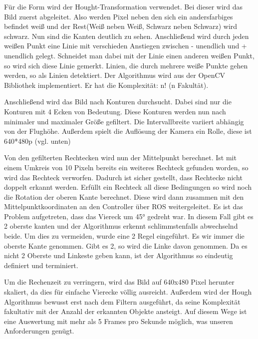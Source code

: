 Für die Form wird der Hought-Transformation verwendet. Bei dieser wird das Bild zuerst abgeleitet. Also werden Pixel neben den sich ein andersfarbiges befindet weiß und der Rest(Weiß neben Weiß, Schwarz neben Schwarz) wird schwarz. Nun sind die Kanten deutlich zu sehen. Anschließend wird durch jeden weißen Punkt eine Linie mit verschieden Anstiegen zwischen - unendlich und + unendlich gelegt. Schneidet man dabei mit der Linie einen anderen weißen Punkt, so wird sich diese Linie gemerkt. Linien, die durch mehrere weiße Punkte gehen werden, so als Linien detektiert. Der Algorithmus wird aus der OpenCV Bibliothek implementiert. Er hat die Komplexität: n! (n Fakultät). \cite{wenyu2007fast}

Anschließend wird das Bild nach Konturen durchsucht. Dabei sind nur die Konturen mit 4 Ecken von Bedeutung. Diese Konturen werden nun nach minimaler und maximaler Größe gefiltert. Die Intervallbreite variiert abhängig von der Flughöhe. Außerdem spielt die Auflösung der Kamera ein Rolle, diese ist 640*480p (vgl. unten)

Von den gefilterten Rechtecken wird nun der Mittelpunkt berechnet. Ist mit einem Umkreis von 10 Pixeln bereits ein weiteres Rechteck gefunden worden, so wird das Rechteck verworfen. Dadurch ist sicher gestellt, dass Rechtecke nicht doppelt erkannt werden. Erfüllt ein Rechteck all diese Bedingungen so wird noch die Rotation der oberen Kante berechnet. Diese wird dann zusammen mit den Mittelpunktkoordinaten an den Controller über ROS weitergeleitet. Es ist das Problem aufgetreten, dass das Viereck um 45° gedreht war. In diesem Fall gibt es 2 oberste kanten und der Algorithmus erkennt schlimmstenfalls abwechselnd beide. Um dies zu vermeiden, wurde eine 2 Regel eingeführt. Es wir immer die oberste Kante genommen. Gibt es 2, so wird die Linke davon genommen. Da es nicht 2 Oberste und Linkeste geben kann, ist der Algorithmus so eindeutig definiert und terminiert.\cite{lagunovsky1997fast}

Um die Rechenzeit zu verringern, wird das Bild auf 640x480 Pixel herunter skaliert, da dies für einfache Vierecke völlig ausreicht. Außerdem wird der Hough Algorithmus bewusst erst nach dem Filtern ausgeführt, da seine Komplexität fakultativ mit der Anzahl der erkannten Objekte ansteigt. Auf diesem Wege ist eine Auswertung mit mehr als 5 Frames pro Sekunde möglich, was unseren Anforderungen genügt.

